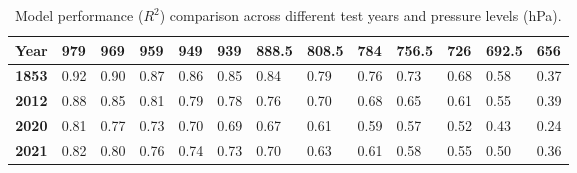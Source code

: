 \documentclass[11pt]{article}
\begin{document}
    \begin{table}[htbp]
        \centering
        \caption{Model performance ($R^2$) comparison across different test years and pressure levels (hPa).}
        \label{tab:model_comparison}
        \begin{tabularx}{\textwidth}{c|*{12}{X}}
            \hline
            \textbf{Year} & \textbf{979} & \textbf{969} & \textbf{959} & \textbf{949} & \textbf{939} & \textbf{888.5} & \textbf{808.5} & \textbf{784} & \textbf{756.5} & \textbf{726} & \textbf{692.5} & \textbf{656} \\ 
            \hline
            \textbf{1853} & 0.92 & 0.90 & 0.87 & 0.86 & 0.85 & 0.84 & 0.79 & 0.76 & 0.73 & 0.68 & 0.58 & 0.37 \\
            \textbf{2012} & 0.88 & 0.85 & 0.81 & 0.79 & 0.78 & 0.76 & 0.70 & 0.68 & 0.65 & 0.61 & 0.55 & 0.39 \\
            \textbf{2020} & 0.81 & 0.77 & 0.73 & 0.70 & 0.69 & 0.67 & 0.61 & 0.59 & 0.57 & 0.52 & 0.43 & 0.24 \\
            \textbf{2021} & 0.82 & 0.80 & 0.76 & 0.74 & 0.73 & 0.70 & 0.63 & 0.61 & 0.58 & 0.55 & 0.50 & 0.36 \\ 
            \hline
        \end{tabularx}
    \end{table}
    
\end{document}

